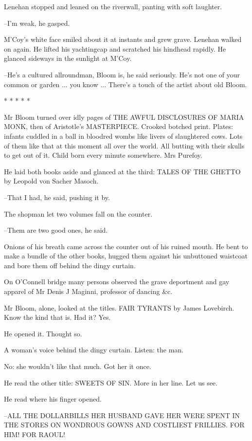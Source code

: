 Lenehan stopped and leaned on the riverwall, panting with soft
laughter.

--I'm weak, he gasped.

M'Coy's white face smiled about it at instants and grew grave.
Lenehan walked on again. He lifted his yachtingcap and scratched his
hindhead rapidly. He glanced sideways in the sunlight at M'Coy.

--He's a cultured allroundman, Bloom is, he said seriously. He's not one
of your common or garden ... you know ... There's a touch of the artist
about old Bloom.


    * * * * *


Mr Bloom turned over idly pages of THE AWFUL DISCLOSURES OF MARIA
MONK, then of Aristotle's MASTERPIECE. Crooked botched print. Plates:
infants cuddled in a ball in bloodred wombs like livers of slaughtered
cows. Lots of them like that at this moment all over the world. All
butting with their skulls to get out of it. Child born every minute
somewhere. Mrs Purefoy.

He laid both books aside and glanced at the third: TALES OF THE GHETTO
by Leopold von Sacher Masoch.

--That I had, he said, pushing it by.

The shopman let two volumes fall on the counter.

--Them are two good ones, he said.

Onions of his breath came across the counter out of his ruined
mouth. He bent to make a bundle of the other books, hugged them against
his unbuttoned waistcoat and bore them off behind the dingy curtain.

On O'Connell bridge many persons observed the grave deportment
and gay apparel of Mr Denis J Maginni, professor of dancing \&c.

Mr Bloom, alone, looked at the titles. FAIR TYRANTS by James Lovebirch.
Know the kind that is. Had it? Yes.

He opened it. Thought so.

A woman's voice behind the dingy curtain. Listen: the man.

No: she wouldn't like that much. Got her it once.

He read the other title: SWEETS OF SIN. More in her line. Let us see.

He read where his finger opened.

--ALL THE DOLLARBILLS HER HUSBAND GAVE HER WERE SPENT IN THE STORES ON
WONDROUS GOWNS AND COSTLIEST FRILLIES. FOR HIM! FOR RAOUL!

